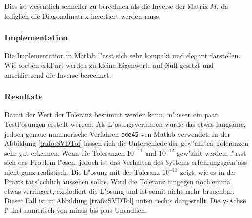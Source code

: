 \begin{refsection}
Dies ist wesentlich schneller zu berechnen als die Inverse der Matrix $M$, da lediglich die Diagonalmatrix invertiert werden muss.

\subsubsection{Implementation}
Die Implementation in Matlab l"asst sich sehr kompakt und elegant darstellen. Wie soeben erkl"art werden zu kleine Eigenwerte auf Null gesetzt und anschliessend die Inverse berechnet. 

{\scriptsize }

\subsubsection{Resultate}
Damit der Wert der Toleranz bestimmt werden kann, m"ussen ein paar Testl"osungen erstellt werden. Als L"osungsverfahren wurde das etwas langsame, jedoch genaue nummerische Verfahren \texttt{ode45} von Matlab verwendet. In der Abbildung \ref{trafo:SVDTol} lassen sich die Unterschiede der gew"ahlten Toleranzen sehr gut erkennen. Wenn die Toleranzen $10^{-11}$ und $10^{-12}$ gew"ahlt werden, l"asst sich das Problem l"osen, jedoch ist das Verhalten des Systems erfahrungsgem"ass nicht ganz realistisch. Die L"osung mit der Toleranz $10^{-13}$ zeigt, wie es in der Praxis tats"achlich aussehen sollte. Wird die Toleranz hingegen noch einmal etwas verringert, explodiert die L"osung und ist somit nicht mehr brauchbar. Dieser Fall ist in Abbildung \ref{trafo:SVDTol} unten rechts dargestellt. Die y-Achse f"uhrt numerisch von minus bis plus Unendlich.


\end{refsection}
